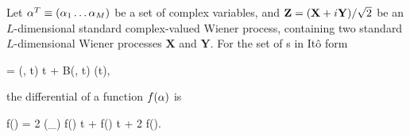 \begin{theorem}
\label{thm:fpe-sde:ito-formula:ito-f-complex}
	Let $\mathbf{\alpha}^T \equiv (\alpha_1 \ldots \alpha_M)$ be a set of complex variables, and $\mathbf{Z} = (\mathbf{X} + i\mathbf{Y}) / \sqrt{2}$ be an $L$-dimensional standard complex-valued Wiener process, containing two standard $L$-dimensional Wiener processes $\mathbf{X}$ and $\mathbf{Y}$.
	For the set of s in It\^o form
	\begin{eqn*}
		\upd\balpha = \avec(\balpha, t) \upd t + B(\balpha, t) \upd\Zvec(t),
	\end{eqn*}
	the differential of a function $f(\mathbf{\alpha})$ is
	\begin{eqn*}
		\upd f(\balpha) =
			2 \Real (\avec \cdot \vcwd_{\balpha}) f(\balpha) \upd t
			+  f(\balpha) \upd t
			+ 2 \Real {} f(\balpha).
	\end{eqn*}
\end{theorem}
